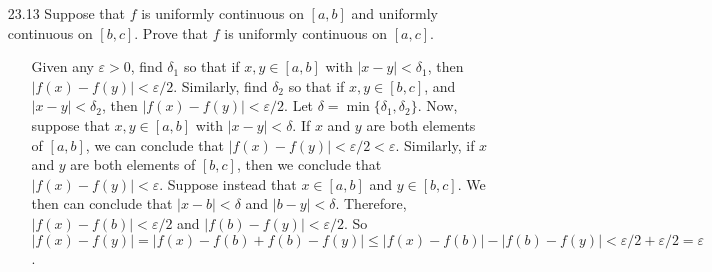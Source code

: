 \documentclass[12pt]{article}
\begin{document}
\begin{enumerate}
\item[23.13] Suppose that $f$ is uniformly continuous on $[a, b]$ and uniformly continuous on $[b, c]$. Prove that $f$ is uniformly continuous on $[a, c]$.
\begin{enumerate}
\item[] Given any $\varepsilon > 0$, find $\delta_1$ so that if $x, y \in [a, b]$ 
with $|x - y| < \delta_1$, then $|f(x) - f(y)| < \varepsilon /2$. Similarly, find
$\delta_2$ so that if $x, y \in [b, c]$, and $|x - y| < \delta_2$, then 
$|f(x) - f(y)| < \varepsilon /2$. Let $\delta = \min \{\delta_1, \delta_2 \}$.
Now, suppose that $x, y \in [a, b]$ with $|x - y| < \delta$. If $x$ and $y$ are both
elements of $[a, b]$, we can conclude that $|f(x) - f(y)| < \varepsilon /2 < \varepsilon$.
Similarly, if $x$ and $y$ are both elements of $[b, c]$, then we conclude that
$|f(x) - f(y)| < \varepsilon$.
Suppose instead that $x \in [a, b]$ and $y \in [b, c]$. We then can conclude
that $|x - b| < \delta$ and $|b - y| < \delta$. Therefore, 
$|f(x) - f(b)| < \varepsilon /2$ and $|f(b) - f(y)| < \varepsilon /2$. So 
$|f(x) - f(y)| = |f(x) - f(b) + f(b) - f(y)| \leq |f(x) - f(b)| - |f(b) - f(y)|
< \varepsilon /2 + \varepsilon /2 = \varepsilon$.
\end{enumerate}


\end{enumerate}
\end{document}
